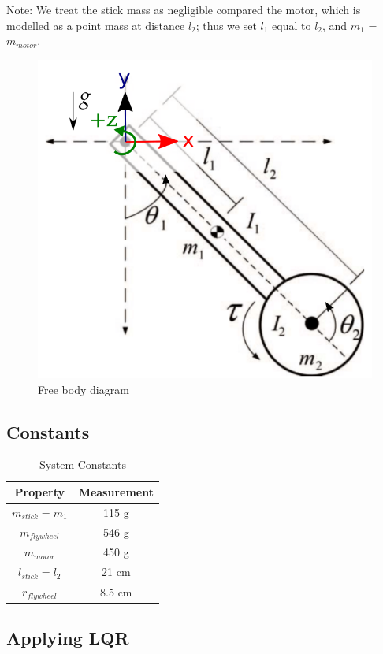 \documentclass[conference]{IEEEtran}
\begin{document}
Note: We treat the stick mass as negligible compared the motor, which is
modelled as a point mass at distance $l_2$; thus we set $l_1$ equal to $l_2$,
and $m_1$ = $m_{motor}$.

\begin{figure}[!t]
    \centering
    \includegraphics[width=0.5\linewidth]{images/freebody.png}
    \caption{Free body diagram}
    \label{}
\end{figure}

\subsection{Constants}

\begin{table}[!t]
    \renewcommand{\arraystretch}{1.5}
    \caption{System Constants}
    \label{tbl:systemparameters}
    \centering
    \begin{tabular}{|c|c|}
        \hline
        Property & Measurement \\
        \hline
        $m_{stick} = m_1$ & 115 g \\
        $m_{flywheel}$ & 546 g\\
        $m_{motor}$ & 450 g \\ %
        $l_{stick} = l_2$ & 21 cm \\
        $r_{flywheel}$ & 8.5 cm \\ %
        \hline
    \end{tabular}
\end{table}

\subsection{Applying LQR}
\end{document}

